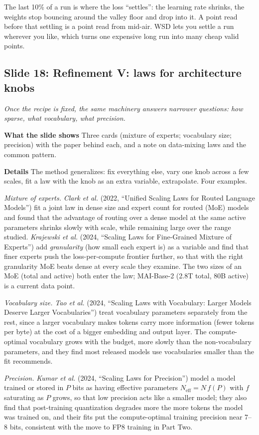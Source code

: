\documentclass[11pt,letterpaper]{article}
\newcommand{\slide}[3]{%
  \subsection[Slide #1: #2]{Slide #1: #2}%
  {\color{muted}\itshape #3\par}\medskip}
\newcommand{\para}[1]{\medskip\noindent\textbf{#1}\quad}
\newenvironment{intuition}{\begin{tcolorbox}[intuitionbox]}{\end{tcolorbox}}
\begin{document}
\begin{intuition}
The last 10\% of a run is where the loss ``settles'': the learning rate shrinks, the weights stop bouncing around the valley floor and drop into it. A point read before that settling is a point read from mid-air. WSD lets you settle a run wherever you like, which turns one expensive long run into many cheap valid points.
\end{intuition}

\slide{18}{Refinement V: laws for architecture knobs}{Once the recipe is fixed, the same machinery answers narrower questions: how sparse, what vocabulary, what precision.}

\para{What the slide shows} Three cards (mixture of experts; vocabulary size; precision) with the paper behind each, and a note on data-mixing laws and the common pattern.

\para{Details} The method generalizes: fix everything else, vary one knob across a few scales, fit a law with the knob as an extra variable, extrapolate. Four examples.

\emph{Mixture of experts.} \emph{Clark et al.} (2022, ``Unified Scaling Laws for Routed Language Models'') fit a joint law in dense size and expert count for routed (MoE) models and found that the advantage of routing over a dense model at the same active parameters shrinks slowly with scale, while remaining large over the range studied. \emph{Krajewski et al.} (2024, ``Scaling Laws for Fine-Grained Mixture of Experts'') add \emph{granularity} (how small each expert is) as a variable and find that finer experts push the loss-per-compute frontier further, so that with the right granularity MoE beats dense at every scale they examine. The two sizes of an MoE (total and active) both enter the law; MAI-Base-2 (2.8T total, 80B active) is a current data point.

\emph{Vocabulary size.} \emph{Tao et al.} (2024, ``Scaling Laws with Vocabulary: Larger Models Deserve Larger Vocabularies'') treat vocabulary parameters separately from the rest, since a larger vocabulary makes tokens carry more information (fewer tokens per byte) at the cost of a bigger embedding and output layer. The compute-optimal vocabulary grows with the budget, more slowly than the non-vocabulary parameters, and they find most released models use vocabularies smaller than the fit recommends.

\emph{Precision.} \emph{Kumar et al.} (2024, ``Scaling Laws for Precision'') model a model trained or stored in $P$ bits as having effective parameters $N_{\text{eff}}=N\,f(P)$ with $f$ saturating as $P$ grows, so that low precision acts like a smaller model; they also find that post-training quantization degrades more the more tokens the model was trained on, and their fits put the compute-optimal training precision near 7--8 bits, consistent with the move to FP8 training in Part Two.
\end{document}
